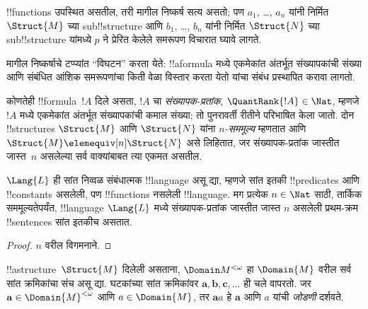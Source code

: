 \documentclass[../../../include/open-logic-section]{subfiles}
\begin{document}
\begin{rem}
!!{function}s उपस्थित असतील, तरी मागील निष्कर्ष सत्य असतो; पण $a_1$,
\dots, $a_n$ यांनी निर्मित $\Struct{M}$ च्या sub!!{structure} आणि
$b_1$, \dots, $b_n$ यांनी निर्मित $\Struct{N}$ च्या
sub!!{structure} यांमध्ये $p$ ने प्रेरित केलेले समरूपण विचारात घ्यावे
लागते.
\end{rem}

मागील निष्कर्षाचे टप्प्यांत ``विघटन'' करता येते: !!a{formula} मध्ये
एकमेकांत अंतर्भूत संख्यापकांची संख्या आणि संबंधित आंशिक समरूपणांचा
किती वेळा विस्तार करता येतो यांचा संबंध प्रस्थापित करावा लागतो.

\begin{defn}
  कोणतेही !!{formula}~$!A$ दिले असता, $!A$ चा
  \emph{संख्यापक-प्रतांक}, $\QuantRank{!A} \in \Nat$, म्हणजे $!A$ मध्ये एकमेकांत अंतर्भूत
  संख्यापकांची कमाल संख्या; तो पुनरावर्ती रीतीने परिभाषित केला जातो.
  दोन !!{structure}s $\Struct{M}$ आणि $\Struct{N}$ यांना
  \emph{$n$-सममूल्य} म्हणतात आणि $\Struct{M} \elemequiv[n] \Struct{N}$
  असे लिहितात, जर संख्यापक-प्रतांक जास्तीत जास्त~$n$ असलेल्या सर्व
  वाक्यांबाबत त्या एकमत असतील.
\end{defn}

\begin{prop}
  $\Lang{L}$ ही सांत निव्वळ संबंधात्मक !!{language} असू द्या, म्हणजे
  सांत इतकी !!{predicate}s आणि !!{constant}s असलेली, पण !!{function}s
  नसलेली !!{language}. मग प्रत्येक $n \in \Nat$ साठी, तार्किक
  सममूल्यतेपर्यंत, !!{language} $\Lang{L}$ मध्ये संख्यापक-प्रतांक
  जास्तीत जास्त $n$ असलेली प्रथम-क्रम !!{sentence}s सांत इतकीच असतात.
\end{prop}

\begin{proof}
  $n$ वरील विगमनाने.
\end{proof}

\begin{defn}
  !!a{structure}~$\Struct{M}$ दिलेली असताना, $\Domain M^{<\omega}$ हा
  $\Domain{M}$ वरील सर्व सांत क्रमिकांचा संच असू द्या. घटकांच्या सांत
  क्रमिकांवर $\mathbf{a}, \mathbf{b}, \mathbf{c}, \ldots$ ही चले वापरतो.
  जर $\mathbf{a} \in \Domain{M}^{<\omega}$ आणि $a \in \Domain{M}$,
  तर $\mathbf{a}a$ हे $\mathbf{a}$ आणि $a$ यांची \emph{जोडणी} दर्शवते.
\end{defn}
\end{document}
